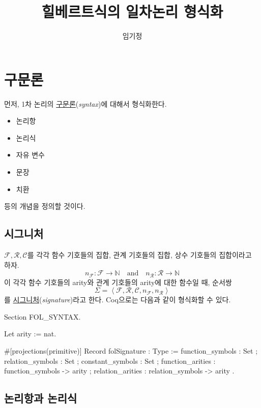 \documentclass[12pt]{paper}
\title{힐베르트식의 일차논리 형식화}
\author{임기정}
\begin{document}
\maketitle

\section{구문론}

먼저, 1차 논리의 \underline{구문론}(\textit{syntax})에 대해서 형식화한다.
\begin{itemize}
\item 논리항
\item 논리식
\item 자유 변수
\item 문장
\item 치환
\end{itemize}
등의 개념을 정의할 것이다.

\subsection{시그니처}

$\mathcal{F}, \mathcal{R}, \mathcal{C}$를
각각 함수 기호들의 집합, 관계 기호들의 집합, 상수 기호들의 집합이라고 하자.
$$n_\mathcal{F} : \mathcal{F} \to \mathbb{N} \quad \mathrm{and} \quad n_\mathcal{R} : \mathcal{R} \to \mathbb{N}$$
이 각각 함수 기호들의 arity와 관계 기호들의 arity에 대한 함수일 때, 순서쌍
$$ \Sigma = \left\langle \mathcal{F}, \mathcal{R}, \mathcal{C}, n_\mathcal{F} , n_\mathcal{R} \right\rangle $$
를 \underline{시그니처}(\textit{signature})라고 한다.
Coq으로는 다음과 같이 형식화할 수 있다.
\begin{coqcode}
Section FOL_SYNTAX.

Let arity := nat.
    
#[projections(primitive)]
Record folSignature : Type :=
  { function_symbols : Set
  ; relation_symbols : Set
  ; constant_symbols : Set
  ; function_arities : function_symbols -> arity
  ; relation_arities : relation_symbols -> arity
  }.
\end{coqcode}

\newpage

\subsection[short]{논리항과 논리식}
\end{document}
